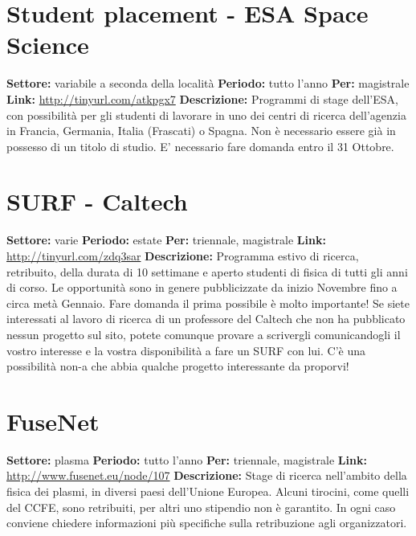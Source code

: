 \documentclass[a4paper,10pt]{article}
\begin{document}
\section{Student placement - ESA	Space Science}	
\textbf{Settore:} variabile a seconda della località\newline
\textbf{Periodo:} tutto l'anno\newline
\textbf{Per:} magistrale\newline
\textbf{Link:} \url{http://tinyurl.com/atkpgx7} \newline
\textbf{Descrizione:} Programmi di stage dell’ESA, con possibilità per gli studenti di lavorare in uno dei centri di ricerca dell’agenzia in Francia, Germania, Italia (Frascati) o Spagna. Non è necessario essere già in possesso di un titolo di studio. E’ necessario fare domanda entro il 31 Ottobre.	

\section{SURF - Caltech}
\textbf{Settore:} varie\newline
\textbf{Periodo:} estate\newline
\textbf{Per:} triennale, magistrale\newline
\textbf{Link:} \url{http://tinyurl.com/zdq3sar} \newline
\textbf{Descrizione:} Programma estivo di ricerca, retribuito, della durata di 10 settimane e aperto studenti di fisica di tutti gli anni di corso. Le opportunità sono in genere pubblicizzate da inizio Novembre fino a circa metà Gennaio. Fare domanda il prima possibile è molto importante! Se siete interessati al lavoro di ricerca di un professore del Caltech che non ha pubblicato nessun progetto sul sito, potete comunque provare a scrivergli comunicandogli il vostro interesse e la vostra disponibilità a fare un SURF con lui. C’è una possibilità non-a che abbia qualche progetto interessante da proporvi!	

\section{FuseNet}
\textbf{Settore:} plasma\newline
\textbf{Periodo:} tutto l'anno\newline
\textbf{Per:} triennale, magistrale\newline
\textbf{Link:} \url{http://www.fusenet.eu/node/107} \newline
\textbf{Descrizione:} Stage di ricerca nell’ambito della fisica dei plasmi, in diversi paesi dell’Unione Europea. Alcuni tirocini, come quelli del CCFE, sono retribuiti, per altri uno stipendio non è garantito. In ogni caso conviene chiedere informazioni più specifiche sulla retribuzione agli organizzatori.	
\end{document}
